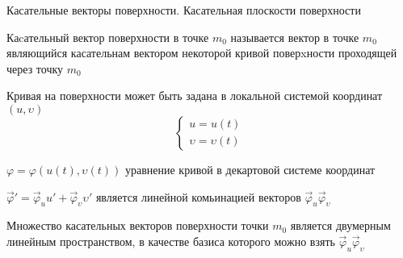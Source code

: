 \begin{title}
  Касательные векторы поверхности. Касательная плоскости поверхности
\end{title}

\begin{define}
  Каcательный вектор поверхности в точке $m_0$ называется вектор в точке $m_0$
  являющийся касательнам вектором некоторой кривой поверxности проходящей
  через точку $m_0$

  Кривая на поверхности может быть задана в локальной системой координат
  $(u, \upsilon)$
  $$
  \left\{
    \begin{array}{l}
      u = u(t) \\
      \upsilon = \upsilon(t)
    \end{array}
  \right.
  $$

  $\varphi = \varphi(u(t), \upsilon(t))$ уравнение кривой в декартовой
  системе координат

  $\vec \varphi' = \vec \varphi_u u' + \vec \varphi_{\upsilon}
  \upsilon'$ является линейной комьинацией векторов $\vec \varphi_u
  \vec \varphi_{\upsilon}$
\end{define}

\begin{theorem}
  Множество касательных векторов поверхности точки $m_0$ является двумерным
  линейным пространством, в качестве базиса которого можно взять
  $\vec \varphi_u \vec \varphi_{\upsilon}$
\end{theorem}

